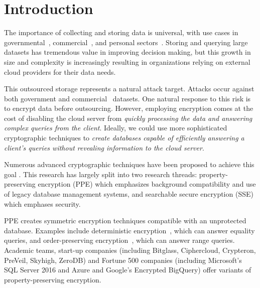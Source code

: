 
\section{Introduction}

The importance of collecting and storing data is universal, with use
cases in governmental~\cite{Powers2014},
commercial~\cite{Linoff:2002:MWT:560274,insightdata}, and personal
sectors~\cite{Mons2011}.
Storing and querying large datasets has tremendous value in improving
decision making, but this growth in size and complexity is increasingly
resulting in organizations relying on external cloud providers for their
data needs.

This outsourced storage represents a natural attack target.  Attacks occur against both government \cite{CyberAttacksOPM} and commercial~\cite{CyberAttacks,gressin2017equifax} datasets.
One natural response to this risk is to encrypt data before outsourcing. 
%
However, employing encryption comes at the cost of disabling the cloud server
from {\em quickly processing the data and answering
complex queries from the client}. 
%
Ideally, we could use more sophisticated cryptographic techniques to {\em create databases
capable of efficiently answering a client's queries without revealing
information to the cloud server}.  


Numerous advanced cryptographic techniques have been proposed to achieve
this goal \cite{EC:PanRou12,CCS:CGKO06,EPRINT:ChoGilNao98,EC:BDOP04}.
This research has largely split into two research threads: 
property-preserving encryption (PPE) which
emphasizes background compatibility and use of legacy database
management systems, and searchable secure encryption (SSE) which emphases security.

PPE creates
symmetric encryption techniques
compatible with an unprotected database. Examples include deterministic
encryption~\cite{C:BelBolONe07}, which can answer equality queries, and
order-preserving encryption~\cite{C:BolCheONe11,EC:BCLO09},
which can answer range queries. Academic teams, start-up companies (including Bitglass, Ciphercloud, Crypteron, PreVeil, Skyhigh, ZeroDB) and Fortune
500 companies (including Microsoft's SQL Server 2016 and Azure and Google's Encrypted BigQuery)  offer variants of property-preserving encryption.

